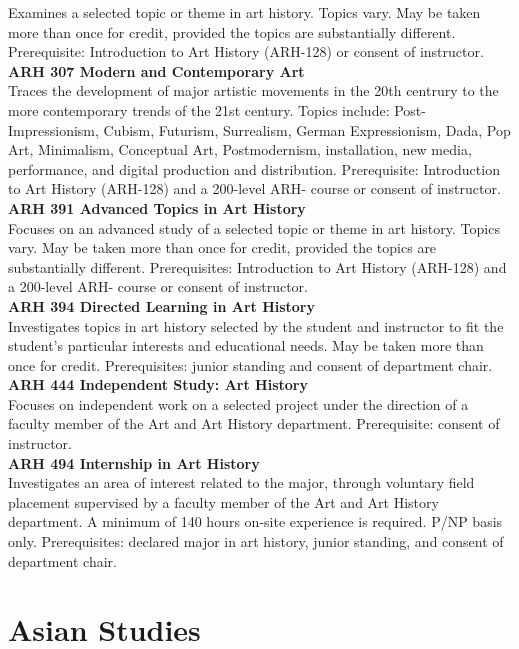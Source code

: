 \documentclass[
  letterpaper,
]{scrbook}
\begin{document}
Examines a selected topic or theme in art history. Topics vary. May be
taken more than once for credit, provided the topics are substantially
different. Prerequisite: Introduction to Art History (ARH-128) or
consent of instructor.\\
\textbf{ARH 307 Modern and Contemporary Art}\\
Traces the development of major artistic movements in the 20th centrury
to the more contemporary trends of the 21st century. Topics include:
Post-Impressionism, Cubism, Futurism, Surrealism, German Expressionism,
Dada, Pop Art, Minimalism, Conceptual Art, Postmodernism, installation,
new media, performance, and digital production and distribution.
Prerequisite: Introduction to Art History (ARH-128) and a 200-level ARH-
course or consent of instructor.\\
\textbf{ARH 391 Advanced Topics in Art History}\\
Focuses on an advanced study of a selected topic or theme in art
history. Topics vary. May be taken more than once for credit, provided
the topics are substantially different. Prerequisites: Introduction to
Art History (ARH-128) and a 200-level ARH- course or consent of
instructor.\\
\textbf{ARH 394 Directed Learning in Art History}\\
Investigates topics in art history selected by the student and
instructor to fit the student's particular interests and educational
needs. May be taken more than once for credit. Prerequisites: junior
standing and consent of department chair.\\
\textbf{ARH 444 Independent Study: Art History}\\
Focuses on independent work on a selected project under the direction of
a faculty member of the Art and Art History department. Prerequisite:
consent of instructor.\\
\textbf{ARH 494 Internship in Art History}\\
Investigates an area of interest related to the major, through voluntary
field placement supervised by a faculty member of the Art and Art
History department. A minimum of 140 hours on-site experience is
required. P/NP basis only. Prerequisites: declared major in art history,
junior standing, and consent of department chair.

\section{Asian Studies}\label{asian-studies}
\end{document}
